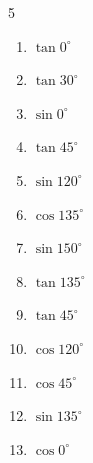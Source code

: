 \begin{multicols}{5}
\begin{enumerate}
  \item $\displaystyle \tan{0^\circ}$

        \phantom{$\displaystyle =0$}

  \item $\displaystyle \tan{30^\circ}$


  \item $\displaystyle \sin{0^\circ}$

        \phantom{$\displaystyle =0$}

  \item $\displaystyle \tan{45^\circ}$

        \phantom{$\displaystyle =1$}

  \item $\displaystyle \sin{120^\circ}$


\columnbreak %

  \item $\displaystyle \cos{135^\circ}$


  \item $\displaystyle \sin{150^\circ}$


  \item $\displaystyle \tan{135^\circ}$

        \phantom{$\displaystyle =-1$}

  \item $\displaystyle \tan{45^\circ}$

        \phantom{$\displaystyle =1$}

  \item $\displaystyle \cos{120^\circ}$


  \item $\displaystyle \cos{45^\circ}$


  \item $\displaystyle \sin{135^\circ}$


  \item $\displaystyle \cos{0^\circ}$


\end{enumerate}
\end{multicols}
